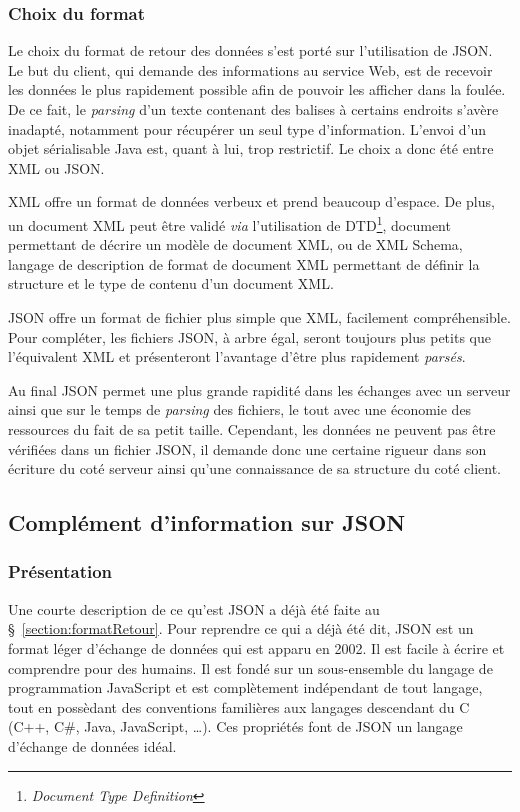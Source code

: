 \subsubsection{Choix du format}

Le choix du format de retour des donn\'ees s'est port\'e sur l'utilisation de JSON.
Le but du client, qui demande des informations au service Web, est de recevoir les donn\'ees le plus rapidement possible afin de pouvoir les afficher dans la foul\'ee.
De ce fait, le \textit{parsing} d'un texte contenant des balises \`a certains endroits s'av\`ere inadapt\'e, notamment pour r\'ecup\'erer un seul type d'information.
L'envoi d'un objet s\'erialisable Java est, quant \`a lui, trop restrictif. Le choix a donc \'et\'e entre XML ou JSON.

XML offre un format de donn\'ees verbeux et prend beaucoup d'espace. 
De plus, un document XML peut \^etre valid\'e \textit{via} l'utilisation de DTD\protect\footnote{\textit{Document Type Definition}}, document permettant de d\'ecrire un mod\`ele de document XML, ou de XML Schema, langage de description de format de document XML permettant de d\'efinir la structure et le type de contenu d'un document XML.

JSON offre un format de fichier plus simple que XML, facilement compr\'ehensible.
Pour compl\'eter, les fichiers JSON, \`a arbre \'egal, seront toujours plus petits que l'\'equivalent XML et pr\'esenteront l'avantage d'\^etre plus rapidement \textit{pars\'es}.

Au final JSON permet une plus grande rapidit\'e dans les \'echanges avec un serveur ainsi que sur le temps de \textit{parsing} des fichiers, le tout avec une \'economie des ressources du fait de sa petit taille.
Cependant, les donn\'ees ne peuvent pas \^etre v\'erifi\'ees dans un fichier JSON, il demande donc une certaine rigueur dans son \'ecriture du cot\'e serveur ainsi qu'une connaissance de sa structure du cot\'e client.

\subsection{Compl\'ement d'information sur JSON}

\subsubsection{Pr\'esentation}

Une courte description de ce qu'est JSON a d\'ej\`a \'et\'e faite au \S~\ref{section:formatRetour}.
Pour reprendre ce qui a d\'ej\`a \'et\'e dit, JSON est un format l\'eger d'\'echange de donn\'ees qui est apparu en 2002.
Il est facile \`a \'ecrire et comprendre pour des humains.
Il est fond\'e sur un sous-ensemble du langage de programmation JavaScript et est compl\`etement ind\'ependant de tout langage, tout en poss\`edant des conventions famili\`eres aux langages descendant du C (C++, C\#, Java, JavaScript, \ldots).
Ces propri\'et\'es font de JSON un langage d'\'echange de donn\'ees id\'eal.

